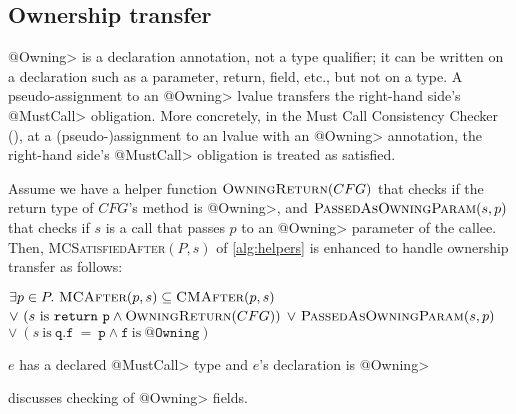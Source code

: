 \subsection{Ownership transfer}
\label{sec:ownership-transfer}

\<@Owning> is a declaration annotation, not a type qualifier; it can be
written on a declaration such as a parameter, return, field, etc., but not
on a type.
A pseudo-assignment to an \<@Owning> lvalue transfers the right-hand side's
\<@MustCall> obligation.
More concretely, in the Must Call Consistency Checker
(), at a (pseudo-)assignment to an lvalue with
an \<@Owning> annotation, the right-hand side's
\<@MustCall> obligation is treated as satisfied.

Assume we have a helper
function $\textsc{OwningReturn}(CFG)$ that checks if the return type of $CFG$'s
method is \<@Owning>, and $\textsc{PassedAsOwningParam}(s,p)$ that checks if $s$ is a
call that passes $p$ to an \<@Owning> parameter of the callee.  Then,
\textsc{MCSatisfiedAfter}$(P,s)$ of \cref{alg:helpers} is enhanced to handle
ownership transfer as follows:

\begin{algorithmic}
  \State \Return $\exists p \in P .\ \textsc{MCAfter}(p,s) \subseteq \textsc{CMAfter}(p,s)$ \newline
  \hspace*{6em} $\vee\ (s \mathrm{\ is\ } \mathtt{return\ p} \wedge \textsc{OwningReturn}(CFG))$ \newline
  \hspace*{6em} $\vee\ \textsc{PassedAsOwningParam}(s,p)$\newline
  \hspace*{6em} $\vee\ (s \mathrm{\ is\ } \mathtt{q.f\ =\ p} \wedge \mathtt{f} \mathrm{\ is\ } \mathtt{@Owning})$
  \EndProcedure

  \State \Return $e$ has a declared \<@MustCall> type and $e$'s declaration is \<@Owning>
  \EndProcedure
\end{algorithmic}
 discusses checking of \<@Owning> fields.


